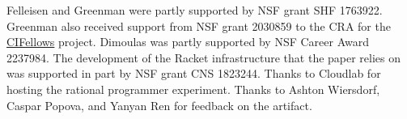 
\begin{acks}
Felleisen and Greenman were partly supported by NSF grant SHF
1763922.
Greenman also received support from NSF grant 2030859 to the CRA for the
\href{https://cifellows2020.org}{CIFellows} project.
 Dimoulas was partly supported by NSF Career Award 2237984.
The development of the Racket infrastructure that the paper relies on
  was supported in part by  NSF grant CNS 1823244.
Thanks to Cloudlab for hosting the rational programmer experiment.
Thanks to Ashton Wiersdorf, Caspar Popova, and Yanyan Ren for feedback on the artifact.


\end{acks}
